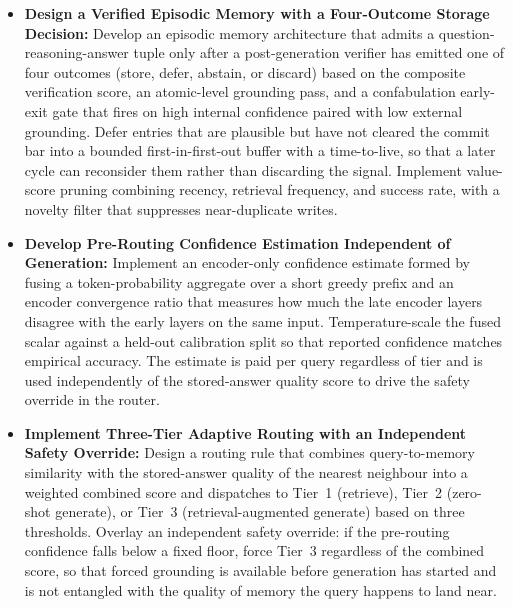 \begin{itemize}
    \item \textbf{Design a Verified Episodic Memory with a Four-Outcome Storage Decision:} Develop an episodic memory architecture that admits a question-reasoning-answer tuple only after a post-generation verifier has emitted one of four outcomes (store, defer, abstain, or discard) based on the composite verification score, an atomic-level grounding pass, and a confabulation early-exit gate that fires on high internal confidence paired with low external grounding. Defer entries that are plausible but have not cleared the commit bar into a bounded first-in-first-out buffer with a time-to-live, so that a later cycle can reconsider them rather than discarding the signal. Implement value-score pruning combining recency, retrieval frequency, and success rate, with a novelty filter that suppresses near-duplicate writes.

    \item \textbf{Develop Pre-Routing Confidence Estimation Independent of Generation:} Implement an encoder-only confidence estimate formed by fusing a token-probability aggregate over a short greedy prefix and an encoder convergence ratio that measures how much the late encoder layers disagree with the early layers on the same input. Temperature-scale the fused scalar against a held-out calibration split so that reported confidence matches empirical accuracy. The estimate is paid per query regardless of tier and is used independently of the stored-answer quality score to drive the safety override in the router.

    \item \textbf{Implement Three-Tier Adaptive Routing with an Independent Safety Override:} Design a routing rule that combines query-to-memory similarity with the stored-answer quality of the nearest neighbour into a weighted combined score and dispatches to Tier~1 (retrieve), Tier~2 (zero-shot generate), or Tier~3 (retrieval-augmented generate) based on three thresholds. Overlay an independent safety override: if the pre-routing confidence falls below a fixed floor, force Tier~3 regardless of the combined score, so that forced grounding is available before generation has started and is not entangled with the quality of memory the query happens to land near.


\end{itemize}
